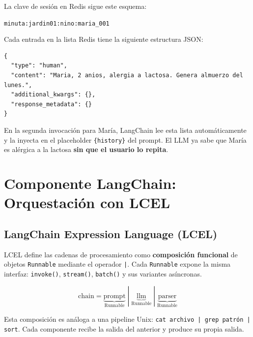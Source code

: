 \documentclass[12pt,a4paper]{article}
\begin{document}
La clave de sesión en Redis sigue este esquema:
\begin{center}
\texttt{minuta:jardin01:nino:maria\_001}
\end{center}

Cada entrada en la lista Redis tiene la siguiente estructura JSON:

\begin{lstlisting}[style=jsonstyle, caption={Estructura de un mensaje almacenado en Redis}]
{
  "type": "human",
  "content": "Maria, 2 anios, alergia a lactosa. Genera almuerzo del lunes.",
  "additional_kwargs": {},
  "response_metadata": {}
}
\end{lstlisting}

En la segunda invocación para María, LangChain lee esta lista automáticamente
y la inyecta en el placeholder \texttt{\{history\}} del prompt. El LLM ya
sabe que María es alérgica a la lactosa \textbf{sin que el usuario lo repita}.

\section{Componente LangChain: Orquestación con LCEL}
\label{sec:langchain}

\subsection{LangChain Expression Language (LCEL)}

LCEL define las cadenas de procesamiento como \textbf{composición funcional}
de objetos \texttt{Runnable} mediante el operador \texttt{|}. Cada
\texttt{Runnable} expone la misma interfaz: \texttt{invoke()},
\texttt{stream()}, \texttt{batch()} y sus variantes asíncronas.

\begin{equation}
\text{chain} = \underbrace{\text{prompt}}_{\text{Runnable}} \;|\;
               \underbrace{\text{llm}}_{\text{Runnable}} \;|\;
               \underbrace{\text{parser}}_{\text{Runnable}}
\end{equation}

Esta composición es análoga a una pipeline Unix:
\texttt{cat archivo | grep patrón | sort}. Cada componente recibe
la salida del anterior y produce su propia salida.
\end{document}
